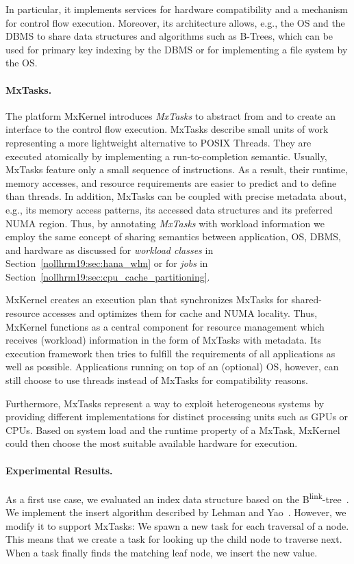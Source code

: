 \documentclass[11pt,dvipdfm]{article}
\begin{document}
In particular, it implements services for hardware compatibility and a mechanism for control flow execution.
Moreover, its architecture allows, e.g., the OS and the DBMS to share data structures and algorithms such as B-Trees, which can be used for primary key indexing by the DBMS or for implementing a file system by the OS.

\paragraph*{MxTasks.}

The platform MxKernel introduces \emph{MxTasks} to abstract from and to create an interface to the control flow execution.
MxTasks describe small units of work representing a more lightweight alternative to POSIX Threads.
They are executed atomically by implementing a run-to-completion semantic.
Usually, MxTasks feature only a small sequence of instructions.
As a result, their runtime, memory accesses, and resource requirements are easier to predict and to define than threads.
In addition, MxTasks can be coupled with precise metadata about, e.g., its memory access patterns, its accessed data structures and its preferred NUMA region.
Thus, by annotating \emph{MxTasks} with workload information we employ the same concept of sharing semantics between application, OS, DBMS, and hardware as discussed for \emph{workload classes} in Section~\ref{nollhrm19:sec:hana_wlm} or for \emph{jobs} in Section~\ref{nollhrm19:sec:cpu_cache_partitioning}.

MxKernel creates an execution plan that synchronizes MxTasks for shared-resource accesses and optimizes them for cache and NUMA locality.
Thus, MxKernel functions as a central component for resource management which receives (workload) information in the form of MxTasks with metadata.
Its execution framework then tries to fulfill the requirements of all applications as well as possible.
Applications running on top of an (optional) OS, however, can still choose to use threads instead of MxTasks for compatibility reasons.

Furthermore, MxTasks represent a way to exploit heterogeneous systems by providing different implementations for distinct processing units such as GPUs or CPUs.
Based on system load and the runtime property of a MxTask, MxKernel could then choose the most suitable available hardware for execution.

\paragraph*{Experimental Results.}
As a first use case, we evaluated an index data structure based on the B\textsuperscript{link}-tree~\cite{nollhrm19:Lehman:1981:ELC:319628.319663}.
We implement the insert algorithm described by Lehman and Yao~\cite{nollhrm19:Lehman:1981:ELC:319628.319663}.
However, we modify it to support MxTasks: We spawn a new task for each traversal of a node.
This means that we create a task for looking up the child node to traverse next.
When a task finally finds the matching leaf node, we insert the new value.
\end{document}
